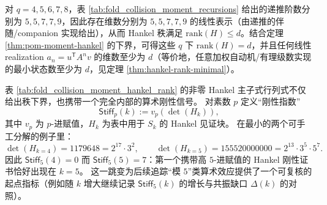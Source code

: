 \begin{corollary}\label{cor:pom-moment-minreal}
对 \(q=4,5,6,7,8\)，表 \ref{tab:fold_collision_moment_recursions} 给出的递推阶数分别为 \(5,5,7,7,9\)，因此存在维数分别为 \(5,5,7,7,9\) 的线性表示（由递推的伴随/companion 实现给出），从而 Hankel 秩满足 \(\mathrm{rank}(H)\le d\)。结合定理 \ref{thm:pom-moment-hankel} 的下界，可得这些 \(q\) 下 \(\mathrm{rank}(H)=d\)，并且任何线性 realization \(a_n=u^{\mathsf T}A^n v\) 的维数至少为 \(d\)（等价地，任意加权自动机/有理级数实现的最小状态数至少为 \(d\)，见定理 \ref{thm:hankel-rank-minimal}）。
\end{corollary}



\begin{remark}[\texorpdfstring{$p$}{p}-进刚性指纹：\texorpdfstring{$p=5$}{p=5} 在 \texorpdfstring{$k=5$}{k=5} 的 Hankel 证书中首次显性出现]\label{rem:pom-hankel-stiffness-p5}
表 \ref{tab:fold_collision_moment_hankel_rank} 的非零 Hankel 主子式行列式不仅给出秩下界，也携带一个完全内部的算术刚性信号。
对素数 \(p\) 定义“刚性指数”
\[
\mathsf{Stiff}_p(k):=v_p(\det(H_k)),
\]
其中 \(v_p\) 为 \(p\)-进赋值，\(H_k\) 为表中用于 \(S_k\) 的 Hankel 见证块。
在最小的两个可手工分解的例子里：
\[
\det(H_{k=4})=1179648=2^{17}\cdot 3^2,
\qquad
\det(H_{k=5})=155520000000=2^{13}\cdot 3^5\cdot 5^7.
\]
因此 \(\mathsf{Stiff}_5(4)=0\) 而 \(\mathsf{Stiff}_5(5)=7\)：第一个携带高 \(5\)-进赋值的 Hankel 刚性证书恰好出现在 \(k=5\)。
这一跳变为后续追踪“模 \(5\)”类算术效应提供了一个可复核的起点指标（例如随 \(k\) 增大继续记录 \(\mathsf{Stiff}_5(k)\) 的增长与共振缺口 \(\Delta(k)\) 的对照）。
\end{remark}



